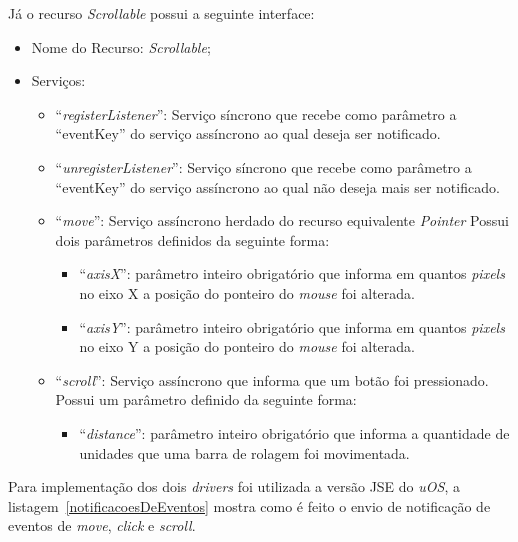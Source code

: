 Já o recurso \emph{Scrollable} possui a seguinte interface:

\begin{itemize}
	
	\item Nome do Recurso: \emph{Scrollable};

	\item Serviços:
		
		\begin{itemize}
			
			\item ``\emph{registerListener}'': Serviço síncrono que recebe como parâmetro a ``eventKey'' do serviço assíncrono ao qual deseja ser notificado.

			\item ``\emph{unregisterListener}'': Serviço síncrono que recebe como parâmetro a ``eventKey'' do serviço assíncrono ao qual não deseja mais ser notificado.

			\item ``\emph{move}'': Serviço assíncrono herdado do recurso equivalente \emph{Pointer} Possui dois parâmetros definidos da seguinte forma:

				\begin{itemize}
					\item ``\emph{axisX}'': parâmetro inteiro obrigatório que informa em quantos \emph{pixels} no eixo X a posição do ponteiro do \emph{mouse} foi alterada.

					\item ``\emph{axisY}'': parâmetro inteiro obrigatório que informa em quantos \emph{pixels} no eixo Y a posição do ponteiro do \emph{mouse} foi alterada.
				\end{itemize}
			
			\item ``\emph{scroll}'': Serviço assíncrono que informa que um botão foi pressionado. Possui um parâmetro definido da seguinte forma:

				\begin{itemize}
					\item ``\emph{distance}'': parâmetro inteiro obrigatório que informa a quantidade de unidades que uma barra de rolagem foi movimentada.
				\end{itemize}

		\end{itemize}
\end{itemize}

Para implementação dos dois \emph{drivers} foi utilizada a versão JSE do \emph{uOS}, a listagem~\ref{notificacoesDeEventos} mostra como é feito o envio de notificação de eventos de \emph{move}, \emph{click} e \emph{scroll}.

